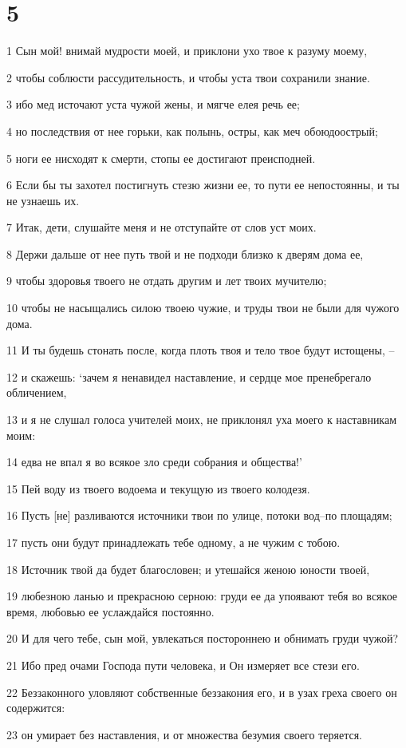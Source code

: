 \chapter{5}

\par 1 Сын мой! внимай мудрости моей, и приклони ухо твое к разуму моему,
\par 2 чтобы соблюсти рассудительность, и чтобы уста твои сохранили знание.
\par 3 ибо мед источают уста чужой жены, и мягче елея речь ее;
\par 4 но последствия от нее горьки, как полынь, остры, как меч обоюдоострый;
\par 5 ноги ее нисходят к смерти, стопы ее достигают преисподней.
\par 6 Если бы ты захотел постигнуть стезю жизни ее, то пути ее непостоянны, и ты не узнаешь их.
\par 7 Итак, дети, слушайте меня и не отступайте от слов уст моих.
\par 8 Держи дальше от нее путь твой и не подходи близко к дверям дома ее,
\par 9 чтобы здоровья твоего не отдать другим и лет твоих мучителю;
\par 10 чтобы не насыщались силою твоею чужие, и труды твои не были для чужого дома.
\par 11 И ты будешь стонать после, когда плоть твоя и тело твое будут истощены, --
\par 12 и скажешь: `зачем я ненавидел наставление, и сердце мое пренебрегало обличением,
\par 13 и я не слушал голоса учителей моих, не приклонял уха моего к наставникам моим:
\par 14 едва не впал я во всякое зло среди собрания и общества!'
\par 15 Пей воду из твоего водоема и текущую из твоего колодезя.
\par 16 Пусть [не] разливаются источники твои по улице, потоки вод--по площадям;
\par 17 пусть они будут принадлежать тебе одному, а не чужим с тобою.
\par 18 Источник твой да будет благословен; и утешайся женою юности твоей,
\par 19 любезною ланью и прекрасною серною: груди ее да упоявают тебя во всякое время, любовью ее услаждайся постоянно.
\par 20 И для чего тебе, сын мой, увлекаться постороннею и обнимать груди чужой?
\par 21 Ибо пред очами Господа пути человека, и Он измеряет все стези его.
\par 22 Беззаконного уловляют собственные беззакония его, и в узах греха своего он содержится:
\par 23 он умирает без наставления, и от множества безумия своего теряется.

